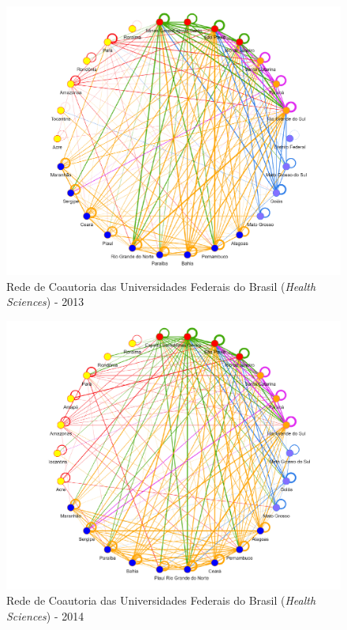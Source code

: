 \begin{figure}[H]
	\centering
	\includegraphics[scale=0.6]{Imagens/rede-2013.pdf}
	\caption{Rede de Coautoria das Universidades Federais do Brasil (\textit{Health Sciences}) - 2013}
	\label{Rede de Coautoria - UF BR 2013}
\end{figure}

\begin{figure}[H]
	\centering
	\includegraphics[scale=0.6]{Imagens/rede-2014.pdf}
	\caption{Rede de Coautoria das Universidades Federais do Brasil (\textit{Health Sciences}) - 2014}
	\label{Rede de Coautoria - UF BR 2014}
\end{figure}


